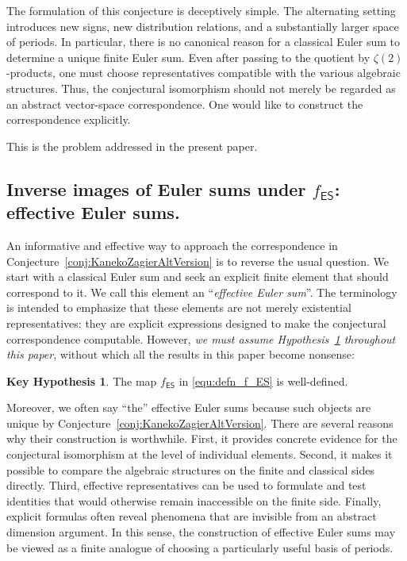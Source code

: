 \documentclass{article}
\newcommand{\ES}{\mathsf {ES}}
\theoremstyle{plain}
\theoremstyle{definition}
\newtheorem{KeyHyp}[thm]{Key Hypothesis}
\begin{document}
The formulation of this conjecture is deceptively simple. The alternating setting introduces new signs, new distribution relations, and a substantially larger space of periods. In particular, there is no canonical reason for a classical Euler sum to determine a unique finite Euler sum. Even after passing to the quotient by $\zeta(2)$-products, one must choose representatives compatible with the various algebraic structures. Thus, the conjectural isomorphism should not merely be regarded as an abstract vector-space correspondence. One would like to construct the correspondence explicitly.

This is the problem addressed in the present paper.

\subsection{Inverse images of Euler sums under $f_\ES$: effective Euler sums.}
An informative and effective way to approach the correspondence in Conjecture~\ref{conj:KanekoZagierAltVersion} is to reverse the usual question. We start with a classical Euler sum and seek an explicit finite element that should correspond to it. We call this element an ``\emph{effective Euler sum}''. The terminology is intended to emphasize that these elements are not merely existential representatives: they are explicit expressions designed to make the conjectural correspondence computable. However, \emph{we must assume Hypothesis~\ref{Hyp:Key} throughout this paper}, without which all the results in this paper become nonsense:
\begin{KeyHyp}\label{Hyp:Key}
The map $f_\ES$ in \eqref{equ:defn_f_ES} is well-defined.
\end{KeyHyp}

Moreover, we often say ``the'' effective Euler sums because such objects are unique by Conjecture~\ref{conj:KanekoZagierAltVersion}. There are several reasons why their construction is worthwhile. First, it provides concrete evidence for the conjectural isomorphism at the level of individual elements. Second, it makes it possible to compare the algebraic structures on the finite and classical sides directly. Third, effective representatives can be used to formulate and test identities that would otherwise remain inaccessible on the finite side. Finally, explicit formulas often reveal phenomena that are invisible from an abstract dimension argument. In this sense, the construction of effective Euler sums may be viewed as a finite analogue of choosing a particularly useful basis of periods.
\end{document}
